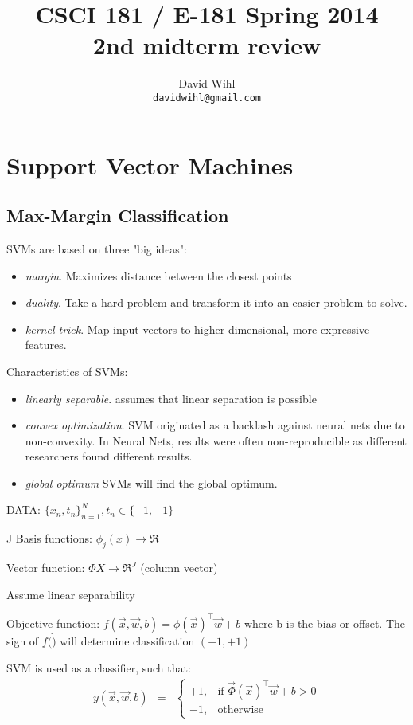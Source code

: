 \documentclass[11pt, oneside]{article}   	%
\title{CSCI 181 / E-181 Spring 2014 \\ 
{\large 2nd midterm review}
}
\author{
  David Wihl\\
  \texttt{davidwihl@gmail.com}
}
\begin{document}
\maketitle

\section{Support Vector Machines}

\subsection{Max-Margin Classification}
SVMs are based on three "big ideas":
\begin{itemize}
	\item \emph{margin}. Maximizes distance between the closest points
	\item \emph{duality}. Take a hard problem and transform it into an easier problem to solve.
	\item \emph{kernel trick}. Map input vectors to higher dimensional, more expressive features.
\end{itemize}

Characteristics of SVMs:
\begin{itemize}
	\item \emph{linearly separable}. assumes that linear separation is possible
	\item \emph{convex optimization}. SVM originated as a backlash against neural nets due to non-convexity. In Neural Nets, results were often non-reproducible as different researchers found different results.
	\item \emph{global optimum} SVMs will find the global optimum.
\end{itemize}


DATA: $\{x_n,t_n\}_{n=1}^N, t_n \in \{-1, +1\}$

J Basis functions: $\phi_j(x)\rightarrow\Re$

Vector function: $\Phi X \rightarrow \Re^J$ (column vector)

Assume linear separability

Objective function: $f(\vec{x},\vec{w},b) = \phi(\vec{x})^\intercal \vec{w} + b$
where b is the bias or offset.
The sign of $f(\dot)$ will determine classification $(-1,+1)$

SVM is used as a classifier, such that:
\begin{eqnarray*}
y(\vec{x},\vec{w},b) &=&
  \left\{\begin{array}{ll}
  	+1, &\mbox{if  }  \vec{\Phi}(\vec{x})^\intercal \vec{w} + b > 0 \\
	-1, &\mbox{otherwise}
  \end{array}\right. \\
\end{eqnarray*}
\end{document}

